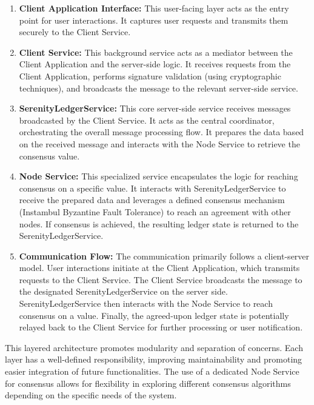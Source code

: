 \begin{enumerate}
    \item \textbf{Client Application Interface:} This user-facing layer acts as the entry point for user interactions. It captures user requests and transmits them securely to the Client Service. 

    \item \textbf{Client Service:} This background service acts as a mediator between the Client Application and the server-side logic. It receives requests from the Client Application, performs signature validation (using cryptographic techniques), and broadcasts the message to the relevant server-side service.  

    \item \textbf{SerenityLedgerService:} This core server-side service receives messages broadcasted by the Client Service. It acts as the central coordinator, orchestrating the overall message processing flow. It prepares the data based on the received message and interacts with the Node Service to retrieve the consensus value.

    \item \textbf{Node Service:} This specialized service encapsulates the logic for reaching consensus on a specific value. It interacts with SerenityLedgerService to receive the prepared data and leverages a defined consensus mechanism (Instambul Byzantine Fault Tolerance) to reach an agreement with other nodes. If consensus is achieved, the resulting ledger state is returned to the SerenityLedgerService.

    \item \textbf{Communication Flow:}  The communication primarily follows a client-server model. User interactions initiate at the Client Application, which transmits requests to the Client Service. The Client Service broadcasts the message to the designated SerenityLedgerService on the server side. SerenityLedgerService then interacts with the Node Service to reach consensus on a value. Finally, the agreed-upon ledger state is potentially relayed back to the Client Service for further processing or user notification.
\end{enumerate}

This layered architecture promotes modularity and separation of concerns. Each layer has a well-defined responsibility, improving maintainability and promoting easier integration of future functionalities. The use of a dedicated Node Service for consensus allows for flexibility in exploring different consensus algorithms depending on the specific needs of the system.

